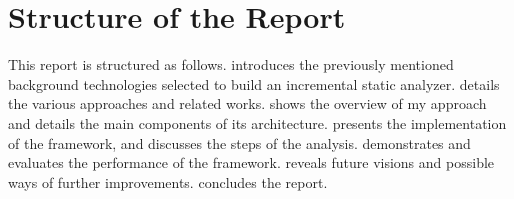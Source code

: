 \section{Structure of the Report}

This report is structured as follows.
 introduces the previously mentioned background technologies selected to build an incremental static analyzer.
 details the various approaches and related works.
 shows the overview of my approach and details the main components of its architecture.
 presents the implementation of the framework, and discusses the steps of the analysis.
 demonstrates and evaluates the performance of the framework.
 reveals future visions and possible ways of further improvements.
 concludes the report.
